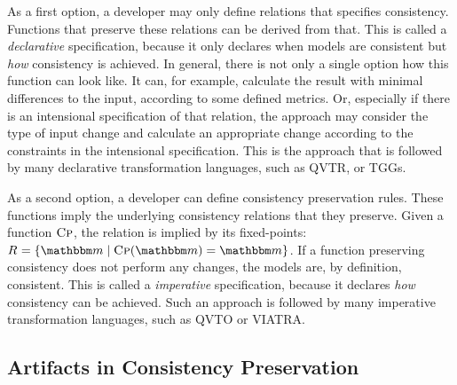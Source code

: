 As a first option, a developer may only define relations that specifies consistency. Functions that preserve these relations can be derived from that.
This is called a \emph{declarative} specification, because it only declares when models are consistent but \emph{how} consistency is achieved.
In general, there is not only a single option how this function can look like.
It can, for example, calculate the result with minimal differences to the input, according to some defined metrics.
Or, especially if there is an intensional specification of that relation, the approach may consider the type of input change and calculate an appropriate change according to the constraints in the intensional specification.
This is the approach that is followed by many declarative transformation languages, such as \gls{QVTR}, or \glspl{TGG}.

As a second option, a developer can define \glspl{consistency preservation rule}.
These functions imply the underlying \glspl{consistency relation} that they preserve.
Given a function $\textsc{Cp}$, the relation is implied by its fixed-points: $\consistencyrelation{R}{} = \setted{\modelset{m} \mid \function{Cp}(\modelset{m}) = \modelset{m}}$.
If a function preserving consistency does not perform any changes, the models are, by definition, consistent.
This is called a \emph{imperative} specification, because it declares \emph{how} consistency can be achieved.
Such an approach is followed by many imperative transformation languages, such as \gls{QVTO} or \gls{VIATRA}.


\subsection{Artifacts in Consistency Preservation}

